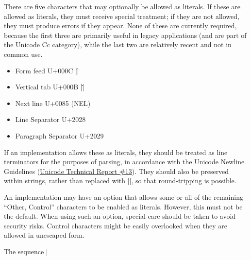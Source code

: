 \documentclass[11pt]{article}
\newcommand{\bespon}{BespON}
\begin{document}
There are five characters that may optionally be allowed as literals.  If these are allowed as literals, they must receive special treatment; if they are not allowed, they must produce errors if they appear.  None of these are currently required, because the first three are primarily useful in legacy applications (and are part of the Unicode Cc category), while the last two are relatively recent and not in common use.
\begin{itemize}
\item Form feed U+000C |\f|
\item Vertical tab U+000B |\v|
\item Next line U+0085 (NEL)
\item Line Separator U+2028
\item Paragraph Separator U+2029
\end{itemize}
If an implementation allows these as literals, they should be treated as line terminators for the purposes of parsing, in accordance with the Unicode Newline Guidelines (\href{http://unicode.org/standard/reports/tr13/tr13-5.html}{Unicode Technical Report \#13}).  They should also be preserved within strings, rather than replaced with |\n|, so that round-tripping is possible.

An implementation may have an option that allows some or all of the remaining ``Other, Control'' characters to be enabled as literals.  However, this must not be the default.  When using such an option, special care should be taken to avoid security risks.  Control characters might be easily overlooked when they are allowed in unescaped form.

The sequence |%
\end{document}
